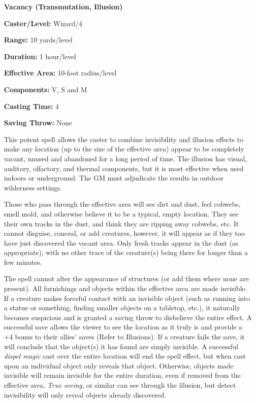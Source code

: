 \begin{multicols}{2}
\noindent
\begin{minipage}{\columnwidth}

\noindent \textbf{Vacancy (Transmutation, Illusion)}

\noindent \textbf{Caster/Level:} Wizard/4

\noindent \textbf{Range:} 10 yards/level

\noindent \textbf{Duration:} 1 hour/level

\noindent \textbf{Effective Area:} 10-foot radius/level

\noindent \textbf{Components:} V, S and M

\noindent \textbf{Casting Time:} 4

\noindent \textbf{Saving Throw:} None

\end{minipage}

This potent spell allows the caster to combine invisibility and illusion effects to make any location (up to the size of the effective area) appear to be completely vacant, unused and abandoned for a long period of time.  The illusion has visual, auditory, olfactory, and thermal components, but it is most effective when used indoors or underground.  The GM must adjudicate the results in outdoor wilderness settings.
 
Those who pass through the effective area will see dirt and dust, feel cobwebs, smell mold, and otherwise believe it to be a typical, empty location.  They see their own tracks in the dust, and think they are ripping away cobwebs, etc.  It cannot disguise, conceal, or add creatures, however, it will appear as if they too have just discovered the vacant area.  Only fresh tracks appear in the dust (as appropriate), with no other trace of the creature(s) being there for longer than a few minutes.  

The spell cannot alter the appearance of structures (or add them where none are present).  All furnishings and objects within the effective area are made invisible.  If a creature makes forceful contact with an invisible object (such as running into a statue or something, finding smaller objects on a tabletop, etc.), it naturally becomes suspicious and is granted a saving throw to disbelieve the entire effect.  A successful save allows the viewer to see the location as it truly is and provide a +4 bonus to their allies' saves (Refer to Illusions).  If a creature fails the save, it will conclude that the object(s) it has found are simply invisible.  A successful \textit{dispel magic} cast over the entire location will end the spell effect, but when cast upon an individual object only reveals that object.  Otherwise, objects made invisible will remain invisible for the entire duration, even if removed from the effective area.  \textit{True seeing}, or similar can see through the illusion, but detect invisibility will only reveal objects already discovered. 


\end{multicols}
